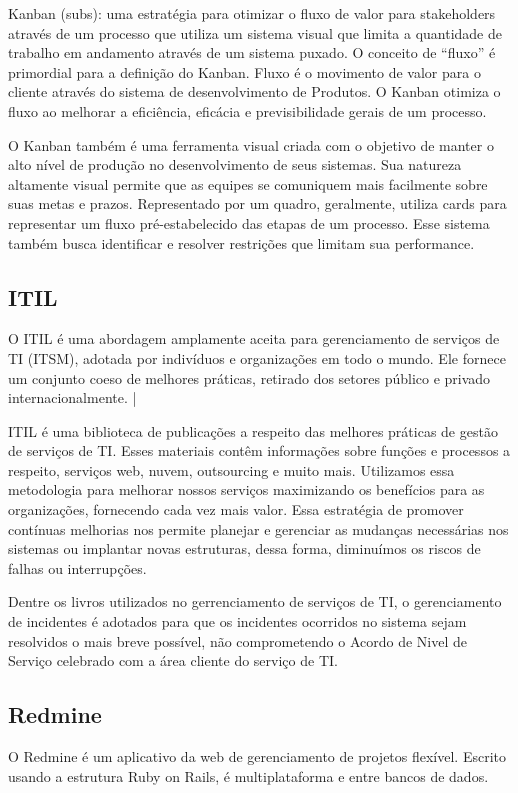 Kanban (subs):  uma estratégia para otimizar o fluxo de valor para stakeholders através de um processo que utiliza um sistema visual que limita a quantidade de trabalho em andamento através de um sistema puxado. O conceito de “fluxo” é primordial para a definição do Kanban. Fluxo é o movimento de valor para o  cliente  através  do  sistema  de  desenvolvimento  de  Produtos.  O  Kanban  otimiza  o  fluxo  ao melhorar a eficiência, eficácia e previsibilidade gerais de um processo.\cite{Kanban}

O Kanban também é uma ferramenta visual criada com o objetivo de manter o alto nível de produção no desenvolvimento de seus sistemas. Sua natureza altamente visual permite que as equipes se comuniquem mais facilmente sobre suas metas e prazos. Representado por um quadro, geralmente, utiliza cards para representar um fluxo pré-estabelecido das etapas de um processo. Esse sistema também busca identificar e resolver restrições que limitam sua performance.

\subsection{ITIL}

O ITIL é uma abordagem amplamente aceita para gerenciamento de serviços de TI (ITSM), adotada por indivíduos e organizações em todo o mundo. Ele fornece um conjunto coeso de melhores práticas, retirado dos setores público e privado internacionalmente.\cite{ITILLivroAXELOS} |\cite{ITIL}

ITIL é uma biblioteca de publicações a respeito das melhores práticas de gestão de serviços de TI. Esses materiais contêm informações sobre funções e processos a respeito, serviços web, nuvem, outsourcing e muito mais. Utilizamos essa metodologia para melhorar nossos serviços maximizando os benefícios para as organizações, fornecendo cada vez mais valor. Essa estratégia de promover contínuas melhorias nos permite planejar e gerenciar as mudanças necessárias nos sistemas ou implantar novas estruturas, dessa forma, diminuímos os riscos de falhas ou interrupções.

Dentre os livros utilizados no gerrenciamento de serviços de TI, o gerenciamento de incidentes é adotados para que os incidentes ocorridos no sistema sejam resolvidos o mais breve possível, não comprometendo o Acordo de Nivel de Serviço celebrado com a área cliente do serviço de TI. \cite{ITILLivro}

\subsection{Redmine}
O Redmine é um aplicativo da web de gerenciamento de projetos flexível. Escrito usando a estrutura Ruby on Rails, é multiplataforma e entre bancos de dados.\cite{Remine}





